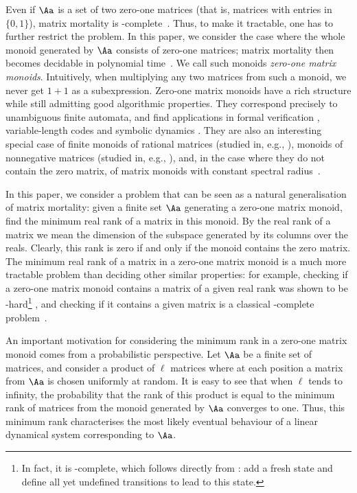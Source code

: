 Even if $\Aa$ is a set of two zero-one matrices (that is, matrices with entries in~$\{0, 1\}$), matrix mortality is \PSPACE-complete~\cite{Ryzhikov2024RP}. Thus, to make it tractable, one has to further restrict the problem. In this paper, we consider the case where the whole monoid generated by $\Aa$ consists of zero-one matrices;  matrix mortality then becomes decidable in polynomial time~\cite{Kiefer2021}. We call such monoids \emph{zero-one matrix monoids}. Intuitively, when multiplying any two matrices from such a monoid, we never get $1 + 1$ as a subexpression. Zero-one matrix monoids have a rich structure while still admitting good algorithmic properties. They correspond precisely to unambiguous finite automata, and find applications in formal verification \cite{Baier2023}, variable-length codes \cite{Berstel2010} and symbolic dynamics \cite{Lind2021}.
They are also an interesting special case of finite monoids of rational matrices (studied in, e.g., \cite{Mandel1977,Jacob1977,Almeida2009,Bumpus2020}), monoids of nonnegative matrices (studied in, e.g., \cite{Protasov2021,Blondel2015,Wu2023,Gerencser2018}), and, in the case where they do not contain the zero matrix, of matrix monoids with constant spectral radius~\cite{Protasov2017}.

In this paper, we consider a problem that can be seen as a natural generalisation of matrix mortality: given a finite set $\Aa$ generating a zero-one matrix monoid, find the minimum real rank of a matrix in this monoid. By the real rank of a matrix we mean the dimension of the subspace generated by its columns over the reals. Clearly, this rank is zero if and only if the monoid contains the zero matrix. 
The minimum real rank of a matrix in a zero-one matrix monoid is a much more tractable problem than deciding other similar properties: for example,  checking if a zero-one matrix monoid contains a matrix of a given real rank was shown to be \NP-hard\footnote{In fact, it is \PSPACE-complete, which follows directly from \cite[Theorem~3]{Berlinkov2014}: add a fresh state and define all yet undefined transitions to lead to this state.} \cite{GORALCIK1995}, and checking if it contains a given matrix is a classical \PSPACE-complete problem~\cite{Kozen1977}.

An important motivation for considering the minimum rank in a zero-one matrix monoid comes from a probabilistic perspective. Let $\Aa$ be a finite set of matrices, and consider a product of $\ell$ matrices where at each position a matrix from $\Aa$ is chosen uniformly at random. It is easy to see that when $\ell$ tends to infinity, the probability that the rank of this product is equal to the minimum rank of matrices from the monoid generated by $\Aa$ converges to one. Thus, this minimum rank characterises the most likely eventual behaviour of a linear dynamical system corresponding to $\Aa$.

